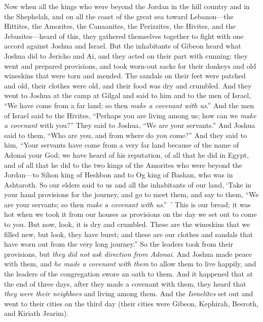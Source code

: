 \begin{biblechapter} %
 Now when all the kings who were beyond the Jordan in the hill country and in the Shephelah, and on all the coast of the great sea toward Lebanon—the Hittites, the Amorites, the Canaanites, the Perizzites, the Hivites, and the Jebusites—heard of this,
\verse they gathered themselves together to fight with one accord against Joshua and Israel.
\verse But the inhabitants of Gibeon heard what Joshua did to Jericho and Ai,
\verse and they acted on their part with cunning: they went and prepared provisions, and took worn-out sacks for their donkeys and old wineskins that were torn and mended.
\verse The sandals on their feet were patched and old, their clothes were old, and their food was dry and crumbled.
\verse And they went to Joshua at the camp at Gilgal and said to him and to the men of Israel, “We have come from a far land; so then \textit{make a covenant with us}.”
\verse And the men of Israel said to the Hivites, “Perhaps you are living among us; how can we \textit{make a covenant} with you?”
\verse They said to Joshua, “We are your servants.” And Joshua said to them, “Who are you, and from where do you come?”
\verse And they said to him, “Your servants have come from a very far land because of the name of Adonai your God; we have heard of his reputation, of all that he did in Egypt,
\verse and of all that he did to the two kings of the Amorites who were beyond the Jordan—to Sihon king of Heshbon and to Og king of Bashan, who was in Ashtaroth.
\verse So our elders said to us and all the inhabitants of our land, ‘Take in your hand provisions for the journey, and go to meet them, and say to them, “We are your servants; so then \textit{make a covenant with us}.” ’
\verse This is our bread; it was hot when we took it from our houses as provisions on the day we set out to come to you. But now, look, it is dry and crumbled.
\verse These are the wineskins that we filled new, but look, they have burst; and these are our clothes and sandals that have worn out from the very long journey.”
\verse So the leaders took from their provisions, but \textit{they did not ask direction from Adonai}.
\verse And Joshua made peace with them, and \textit{he made a covenant with them} to allow them to live happily, and the leaders of the congregation swore an oath to them.
\verse And it happened that at the end of three days, after they made a covenant with them, they heard that \textit{they were their neighbors} and living among them.
\verse And the \textit{Israelites} set out and went to their cities on the third day (their cities were Gibeon, Kephirah, Beeroth, and Kiriath Jearim).

\end{biblechapter}
